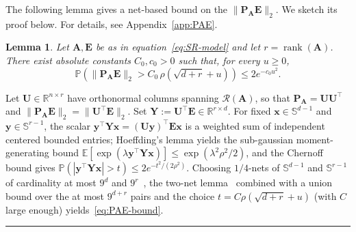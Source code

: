 \documentclass{article}
\newcommand{\twonorm}[1]{\|#1\|_2}
\newcommand{\Ex}[1]{\mbox{}\mathbb{E}\left[#1\right]}
\newcommand{\pr}[1]{\mbox{}\mathbb{P}\left(#1\right)}
\newcommand{\R}{\mathbb{R}} %
\newcommand{\xb}{\mathbf{x}}
\newcommand{\yb}{\mathbf{y}}
\newcommand{\Ab}{\mathbf{A}}
\newcommand{\Eb}{\mathbf{E}}
\newcommand{\Pb}{\mathbf{P}}
\newcommand{\Ub}{\mathbf{U}}
\newcommand{\Yb}{\mathbf{Y}}
\newcommand{\Abtil}{\tilde{\Ab}}
\newcommand{\BlackBox}{\rule{1.5ex}{1.5ex}}  %
\newenvironment{proof}{\par\noindent{\bf Proof\ }}{\hfill\BlackBox\par\medskip}
\newtheorem{lemma}{Lemma}[section]
\newcommand{\rank}{\mathop{\mathrm{rank}}}
\newcommand{\rbr}[1]{\left(#1\right)}
\newcommand{\abr}[1]{\left|#1\right|}
\begin{document}
%

The following lemma gives a net-based bound on the $\twonorm{\Pb_\Ab \Eb}$. We sketch its proof below. For details, see Appendix~\ref{app:PAE}.

\begin{lemma}\label{lem:PAE}
Let $\Ab, \Eb$ be as in equation~\eqref{eq:SR-model} and let $r = \rank(\Ab)$. There exist absolute constants $C_0, c_0 > 0$ such that, for every $u \ge 0$,
\begin{equation}\label{eq:PAE-bound}
    \pr{\twonorm{\Pb_\Ab \Eb} > C_0\,\rho\rbr{\sqrt{d+r} + u}} \le 2 e^{-c_0 u^2}.
\end{equation}
\end{lemma}

\begin{proof}
Let $\Ub \in \R^{n \times r}$ have orthonormal columns spanning $\mathcal{R}(\Ab)$, so that $\Pb_\Ab = \Ub\Ub^\top$ and $\twonorm{\Pb_\Ab \Eb} = \twonorm{\Ub^\top \Eb}$. Set $\Yb := \Ub^\top \Eb \in \R^{r \times d}$. For fixed $\xb \in \mathbb{S}^{d-1}$ and $\yb \in \mathbb{S}^{r-1}$, the scalar $\yb^\top \Yb \xb = (\Ub\yb)^\top \Eb \xb$ is a weighted sum of independent centered bounded entries; Hoeffding's lemma yields the sub-gaussian moment-generating bound $\Ex{\exp(\lambda \yb^\top \Yb \xb)} \le \exp(\lambda^2 \rho^2/2)$, and the Chernoff bound gives $\pr{\abr{\yb^\top \Yb \xb} > t} \le 2 e^{-t^2/(2\rho^2)}$. Choosing $1/4$-nets of $\mathbb{S}^{d-1}$ and $\mathbb{S}^{r-1}$ of cardinality at most $9^d$ and $9^r$~\citep[Corollary~4.2.11]{Vershynin_2026}, the two-net lemma~\citep[Lemma~4.4.2]{Vershynin_2026} combined with a union bound over the at most $9^{d+r}$ pairs and the choice $t = C\rho(\sqrt{d+r}+u)$ (with $C$ large enough) yields~\eqref{eq:PAE-bound}. 
\end{proof} 
\end{document}
